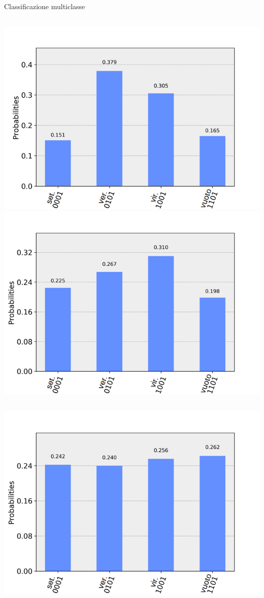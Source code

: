 \documentclass{beamer}
\begin{document}
    \begin{frame}{Classificazione multiclasse}
        \begin{columns}
            \includegraphics[width=.9\linewidth]{gfx/multiclass_versicolor}
            \includegraphics[width=.9\linewidth]{gfx/multiclass_virginica}
        \end{columns}
        \begin{columns}
            \includegraphics[width=.9\linewidth]{gfx/versicolor_reale_20191015_1506.png}

\end{columns}
\end{frame}
\end{document}
